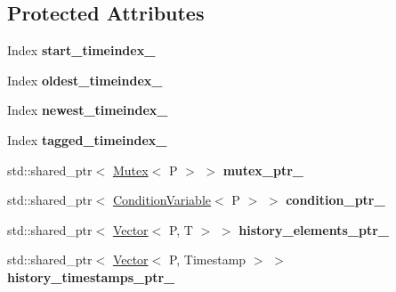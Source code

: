 \subsection*{Protected Attributes}
\begin{DoxyCompactItemize}
\item 
Index {\bfseries start\+\_\+timeindex\+\_\+}\hypertarget{classtime__series_1_1internal_1_1TimeSeriesBase_a6f78dd0d9435126ff803248499fad636}{}\label{classtime__series_1_1internal_1_1TimeSeriesBase_a6f78dd0d9435126ff803248499fad636}

\item 
Index {\bfseries oldest\+\_\+timeindex\+\_\+}\hypertarget{classtime__series_1_1internal_1_1TimeSeriesBase_aec2ed21821c0dc475c9360e9124aa550}{}\label{classtime__series_1_1internal_1_1TimeSeriesBase_aec2ed21821c0dc475c9360e9124aa550}

\item 
Index {\bfseries newest\+\_\+timeindex\+\_\+}\hypertarget{classtime__series_1_1internal_1_1TimeSeriesBase_af82c823d37375e138e8c11c46a506cae}{}\label{classtime__series_1_1internal_1_1TimeSeriesBase_af82c823d37375e138e8c11c46a506cae}

\item 
Index {\bfseries tagged\+\_\+timeindex\+\_\+}\hypertarget{classtime__series_1_1internal_1_1TimeSeriesBase_a68c415d1fa3de6d751d3178d0c10006a}{}\label{classtime__series_1_1internal_1_1TimeSeriesBase_a68c415d1fa3de6d751d3178d0c10006a}

\item 
std\+::shared\+\_\+ptr$<$ \hyperlink{classtime__series_1_1internal_1_1Mutex}{Mutex}$<$ P $>$ $>$ {\bfseries mutex\+\_\+ptr\+\_\+}\hypertarget{classtime__series_1_1internal_1_1TimeSeriesBase_ac192edc73cd3244e0a5ceb7ba1ff3bb6}{}\label{classtime__series_1_1internal_1_1TimeSeriesBase_ac192edc73cd3244e0a5ceb7ba1ff3bb6}

\item 
std\+::shared\+\_\+ptr$<$ \hyperlink{classtime__series_1_1internal_1_1ConditionVariable}{Condition\+Variable}$<$ P $>$ $>$ {\bfseries condition\+\_\+ptr\+\_\+}\hypertarget{classtime__series_1_1internal_1_1TimeSeriesBase_a728279a5c045f0784c176282cc5ae1fe}{}\label{classtime__series_1_1internal_1_1TimeSeriesBase_a728279a5c045f0784c176282cc5ae1fe}

\item 
std\+::shared\+\_\+ptr$<$ \hyperlink{classtime__series_1_1internal_1_1Vector}{Vector}$<$ P, T $>$ $>$ {\bfseries history\+\_\+elements\+\_\+ptr\+\_\+}\hypertarget{classtime__series_1_1internal_1_1TimeSeriesBase_aec36178b209eb829fa44f8c0292e1065}{}\label{classtime__series_1_1internal_1_1TimeSeriesBase_aec36178b209eb829fa44f8c0292e1065}

\item 
std\+::shared\+\_\+ptr$<$ \hyperlink{classtime__series_1_1internal_1_1Vector}{Vector}$<$ P, Timestamp $>$ $>$ {\bfseries history\+\_\+timestamps\+\_\+ptr\+\_\+}\hypertarget{classtime__series_1_1internal_1_1TimeSeriesBase_aa9e47bae6a7e2270a1984bee683d1525}{}\label{classtime__series_1_1internal_1_1TimeSeriesBase_aa9e47bae6a7e2270a1984bee683d1525}

\end{DoxyCompactItemize}


